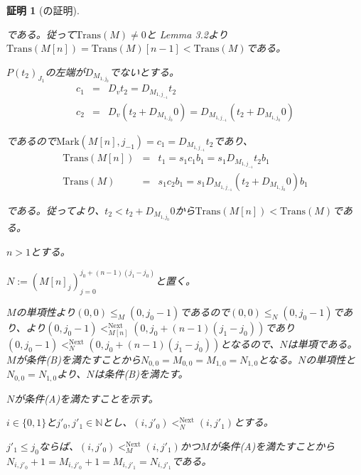 \documentclass[dvipdfmx,uplatex]{jsarticle}
\theoremstyle{customnonumberbreakfortheorem}
\theoremstyle{customnonumberbreakforproof}
\newtheorem{hideableproof}{証明}
\begin{document}
\begin{hideableproof}[の証明]
\begin{indented}
\begin{indented}
\begin{indented}
				\item である。従って\(\textrm{Trans}(M) \neq 0\)と\cite{buc1} Lemma 3.2より\(\textrm{Trans}(M[n]) = \textrm{Trans}(M)[n-1] < \textrm{Trans}(M)\)である。
			\end{indented}
			\item
			\item \(P(t_2)_{J_1}\)の左端が\(D_{M_{1,j_0}}\)でないとする。
			\begin{eqnarray*}
			c_1 & = & D_v t_2 = D_{M_{1,j_{-1}}} t_2 \\
			c_2 & = & D_v(t_2 + D_{M_{1,j_0}} 0) = D_{M_{1,j_{-1}}}(t_2 + D_{M_{1,j_0}} 0)
			\end{eqnarray*}
			\begin{indented}
				\item であるので\(\textrm{Mark}(M[n],j_{-1}) = c_1 = D_{M_{1,j_{-1}}} t_2\)であり、
				\begin{eqnarray*}
				\textrm{Trans}(M[n]) & = & t_1 = s_1 c_1 b_1 = s_1 D_{M_{1,j_{-1}}} t_2 b_1 \\
				\textrm{Trans}(M) & = & s_1 c_2 b_1 = s_1 D_{M_{1,j_{-1}}}(t_2 + D_{M_{1,j_0}} 0) b_1
				\end{eqnarray*}
				\item である。従ってより、\(t_2 < t_2 + D_{M_{1,j_0}} 0\)から\(\textrm{Trans}(M[n]) < \textrm{Trans}(M)\)である。
			\end{indented}
		\end{indented}
		\item
		\item \(n > 1\)とする。
		\begin{indented}
			\item \(N := (M[n]_j)_{j=0}^{j_0+(n-1)(j_1-j_0)}\)と置く。
			\item \(M\)の単項性より\((0,0) \leq_M (0,j_0-1)\)であるので\((0,0) \leq_N (0,j_0-1)\)であり、より\((0,j_0-1) <_{M[n]}^{\textrm{Next}} (0,j_0+(n-1)(j_1-j_0))\)であり\((0,j_0-1) <_N^{\textrm{Next}} (0,j_0+(n-1)(j_1-j_0))\)となるので、\(N\)は単項である。\(M\)が条件(B)を満たすことから\(N_{0,0} = M_{0,0} = M_{1,0} = N_{1,0}\)となる。\(N\)の単項性と\(N_{0,0} = N_{1,0}\)より、\(N\)は条件(B)を満たす。
			\item
			\item \(N\)が条件(A)を満たすことを示す。
			\item \(i \in \{0,1\}\)と\(j'_0,j'_1 \in \mathbb{N}\)とし、\((i,j'_0) <_N^{\textrm{Next}} (i,j'_1)\)とする。
			\item \(j'_1 \leq j_0\)ならば、\((i,j'_0) <_M^{\textrm{Next}} (i,j'_1)\)かつ\(M\)が条件(A)を満たすことから\(N_{i,j'_0}+1 = M_{i,j'_0}+1 = M_{i,j'_1} = N_{i,j'_1}\)である。

\end{indented}
\end{indented}
\end{hideableproof}
\end{document}
